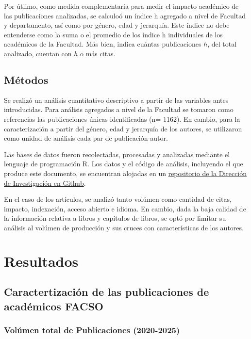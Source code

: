 \documentclass[
  a4paper,
  oneside]{scrbook}
\begin{document}
Por útlimo, como medida complementaria para medir el impacto académico
de las publicaciones analizadas, se calculoó un índice h agregado a
nivel de Facultad y departamento, así como por género, edad y jerarquía.
Este índice no debe entenderse como la suma o el promedio de los índice
h individuales de los académicos de la Facultad. Más bien, indica
cuántas publicaciones \(h\), del total analizado, cuentan con \(h\) o
más citas.

\section{Métodos}\label{muxe9todos}

Se realizó un análisis cuantitativo descriptivo a partir de las
variables antes introducidas. Para análisis agregados a nivel de la
Facultad se tomaron como referencias las publicaciones únicas
identificadas (n= 1162). En cambio, para la caracterización a partir del
género, edad y jerarquía de los autores, se utilizaron como unidad de
análisis cada par de publicación-autor.

Las bases de datos fueron recolectadas, procesadas y analizadas mediante
el lenguaje de programación R. Los datos y el código de análisis,
incluyendo el que produce este documento, se encuentran alojadas en un
\href{https://github.com/facso-investigacion/publicaciones-facso}{repositorio
de la Dirección de Investigación en Github}.

En el caso de los artículos, se analizó tanto volúmen como cantidad de
citas, impacto, indexación, acceso abierto e idioma. En cambio, dada la
baja calidad de la información relativa a libros y capítulos de libros,
se optó por limitar su análisis al volúmen de producción y sus cruces
con características de los autores.


\chapter{Resultados}\label{sec-results}

\section{Caractertización de las publicaciones de académicos
FACSO}\label{caractertizaciuxf3n-de-las-publicaciones-de-acaduxe9micos-facso}

\subsection{Volúmen total de Publicaciones
(2020-2025)}\label{voluxfamen-total-de-publicaciones-2020-2025}
\end{document}
